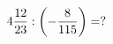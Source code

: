 \documentclass[preview]{standalone}
\begin{document}
\begin{align*}
4 { 12 \over 23 }  :  \left( - { 8 \over 115 } \right)  =  ?
\end{align*}
\end{document}
